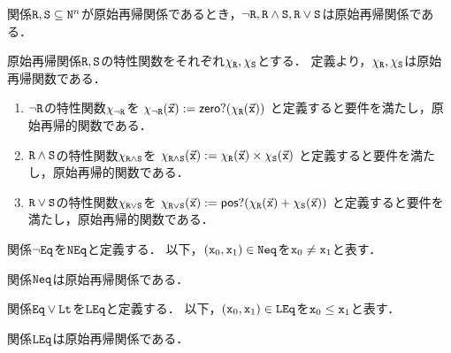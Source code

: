 \begin{myTheorem}
  \label{thm:prim-rec-logical}
  関係$\mathtt{R},\mathtt{S} \subseteq \mathtt{N}^n$が原始再帰関係であるとき，$\lnot\mathtt{R},\mathtt{R}\land\mathtt{S},\mathtt{R}\lor\mathtt{S}$は原始再帰関係である．
\end{myTheorem}
\begin{myProof}[\ref{thm:prim-rec-logical}]
  原始再帰関係$\mathtt{R},\mathtt{S}$の特性関数をそれぞれ$\chi_{\mathtt{R}},\chi_{\mathtt{S}}$とする．
  定義より，$\chi_{\mathtt{R}},\chi_{\mathtt{S}}$は原始再帰関数である．
  \begin{enumerate}
    \item $\lnot\mathtt{R}$の特性関数$\chi_{\lnot\mathtt{R}}$を
          $\chi_{\lnot\mathtt{R}}(\vec{\mathtt{x}}) := \mathsf{zero?}(\chi_{\mathtt{R}}(\vec{\mathtt{x}}))$
          と定義すると要件を満たし，原始再帰的関数である．
    \item $\mathtt{R}\land\mathtt{S}$の特性関数$\chi_{\mathtt{R}\land\mathtt{S}}$を
          $\chi_{\mathtt{R}\land\mathtt{S}}(\vec{\mathtt{x}}) := \chi_{\mathtt{R}}(\vec{\mathtt{x}}) \times \chi_{\mathtt{S}}(\vec{\mathtt{x}})$
          と定義すると要件を満たし，原始再帰的関数である．
    \item $\mathtt{R}\lor\mathtt{S}$の特性関数$\chi_{\mathtt{R}\lor\mathtt{S}}$を
          $\chi_{\mathtt{R}\lor\mathtt{S}}(\vec{\mathtt{x}}) := \mathsf{pos?}(\chi_{\mathtt{R}}(\vec{\mathtt{x}}) + \chi_{\mathtt{S}}(\vec{\mathtt{x}}))$
          と定義すると要件を満たし，原始再帰的関数である．
  \end{enumerate}
\end{myProof}

\begin{myDefinition}
  関係$\lnot \mathtt{Eq}$を$\mathtt{NEq}$と定義する．
  以下，$(\mathtt{x}_0,\mathtt{x}_1) \in \mathtt{Neq}$を$\mathtt{x}_0 \neq \mathtt{x}_1$と表す．
\end{myDefinition}

\begin{myCorollary}
  関係$\mathtt{Neq}$は原始再帰関係である．
\end{myCorollary}

\begin{myDefinition}
  関係$\mathtt{Eq} \lor \mathtt{Lt}$を$\mathtt{LEq}$と定義する．
  以下，$(\mathtt{x}_0,\mathtt{x}_1) \in \mathtt{LEq}$を$\mathtt{x}_0 \leq \mathtt{x}_1$と表す．
\end{myDefinition}

\begin{myCorollary}
  関係$\mathtt{LEq}$は原始再帰関係である．
\end{myCorollary}

